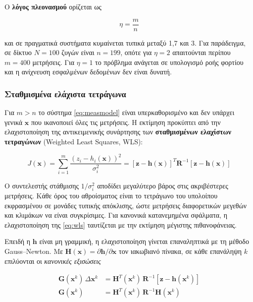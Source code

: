 Ο \textbf{λόγος πλεονασμού} ορίζεται ως

\begin{equation}
\eta = \frac{m}{n}
\label{eq:redundancy}
\end{equation}

και σε πραγματικά συστήματα κυμαίνεται τυπικά μεταξύ 1,7 και 3. Για παράδειγμα, σε δίκτυο
$N = 100$ ζυγών είναι $n = 199$, οπότε για $\eta = 2$ απαιτούνται περίπου $m = 400$
μετρήσεις. Για $\eta = 1$ το πρόβλημα ανάγεται σε υπολογισμό ροής φορτίου και η ανίχνευση
εσφαλμένων δεδομένων δεν είναι δυνατή.

\subsubsection*{Σταθμισμένα ελάχιστα τετράγωνα}

Για $m > n$ το σύστημα \eqref{eq:measmodel} είναι υπερκαθορισμένο και δεν υπάρχει γενικά
$\mathbf{x}$ που ικανοποιεί όλες τις μετρήσεις. Η εκτίμηση προκύπτει από την ελαχιστοποίηση
της αντικειμενικής συνάρτησης των \textbf{σταθμισμένων ελαχίστων τετραγώνων} (Weighted Least
Squares, WLS):

\begin{equation}
J(\mathbf{x}) = \sum_{i=1}^{m} \frac{\left(z_i - h_i(\mathbf{x})\right)^2}{\sigma_i^2}
             = \left[\mathbf{z}-\mathbf{h}(\mathbf{x})\right]^{T} \mathbf{R}^{-1}
               \left[\mathbf{z}-\mathbf{h}(\mathbf{x})\right]
\label{eq:wls}
\end{equation}

Ο συντελεστής στάθμισης $1/\sigma_i^2$ αποδίδει μεγαλύτερο βάρος στις ακριβέστερες μετρήσεις.
Κάθε όρος του αθροίσματος είναι το τετράγωνο του υπολοίπου εκφρασμένου σε μονάδες τυπικής
απόκλισης, ώστε μετρήσεις διαφορετικών μεγεθών και κλιμάκων να είναι συγκρίσιμες. Για
κανονικά κατανεμημένα σφάλματα, η ελαχιστοποίηση της \eqref{eq:wls} ταυτίζεται με την
εκτίμηση μέγιστης πιθανοφάνειας.

Επειδή η $\mathbf{h}$ είναι μη γραμμική, η ελαχιστοποίηση γίνεται επαναληπτικά με τη μέθοδο
Gauss--Newton. Με $\mathbf{H}(\mathbf{x}) = \partial \mathbf{h}/\partial \mathbf{x}$ τον
ιακωβιανό πίνακα, σε κάθε επανάληψη $k$ επιλύονται οι \emph{κανονικές εξισώσεις}

\begin{align}
\mathbf{G}(\mathbf{x}^{k}) \, \Delta \mathbf{x}^{k}
  &= \mathbf{H}^{T}(\mathbf{x}^{k}) \, \mathbf{R}^{-1}
     \left[\mathbf{z} - \mathbf{h}(\mathbf{x}^{k})\right] \\
\mathbf{G}(\mathbf{x}^{k})
  &= \mathbf{H}^{T}(\mathbf{x}^{k}) \, \mathbf{R}^{-1} \mathbf{H}(\mathbf{x}^{k})
\label{eq:gain}
\end{align}

